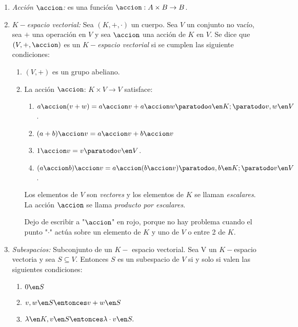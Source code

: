 \begin{enumerate}[label=\tiny\purple{\faIcon{snowman}}]
  \item \textit{Acción $\accion$:} es una función $\accion : A \times B \to B$.

  \item \textit{$K-$espacio vectorial:} Sea $(K, +, \cdot)$ un cuerpo. Sea $V$ un conjunto no vacío, sea $+$ una operación en
        $V$ y sea $\accion$ una acción de $K$ en $V$. Se dice que $(V, +, \accion)$ es un $K-$\textit{espacio vectorial} si se
        cumplen las siguiente condiciones:

        \begin{enumerate}[label=\roman*)]
          \item $(V, +)$ es un grupo abeliano.

          \item La acción $\accion$: $K \times V \to V$ satisface:
                \begin{enumerate}[label=\alph*)]
                  \item $a \accion (v + w) = a \accion v + a \accion w  \paratodo a \en K; \paratodo v, w \en V$.
                  \item $(a + b) \accion v = a \accion v  + b \accion v$
                  \item $1 \accion v = v \paratodo v \en V$.
                  \item $(a \accion b) \accion v = a \accion (b \accion v) \paratodo a, b \en K; \paratodo v \en V$.
                \end{enumerate}

                Los elementos de $V$ son \textit{vectores} y los elementos de $K$ se llaman \textit{escalares}. La acción $\accion$
                se llama \textit{producto por escalares}.

                Dejo de escribir a "$\accion$" en rojo, porque no hay problema cuando el punto "$\cdot$"
                actúa sobre un elemento de $K$ y uno de $V$ o entre  2 de $K$.
        \end{enumerate}

  \item \textit{Subespacios:} Subconjunto de un $K-$ espacio vectorial. Sea V un $K-$espacio vectoria y sea $S \subseteq V$. Entonces $S$ es
        un subespacio de $V$ si y solo si valen las siguientes condiciones:
        \begin{enumerate}[label=\roman*)]
          \item $0 \en S$
          \item $v, w \en S \entonces v + w \en S$
          \item $\lambda \en K, v \en S \entonces \lambda \cdot v \en S.$
        \end{enumerate}


\end{enumerate}
